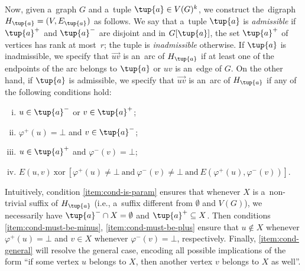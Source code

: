 Now, given a~graph $G$ and a~tuple $\tup{a} \in V(G)^k$, we construct the~digraph $H_{\tup{a}} = (V, E_{\tup{a}})$ as follows.
We say that a~tuple $\tup{a}$ is \emph{admissible} if $\tup{a}^+$ and $\tup{a}^-$ are disjoint and in $G[\tup{a}]$, the set $\tup{a}^+$ of vertices has rank at most~$r$; the tuple is \emph{inadmissible} otherwise.
If $\tup{a}$ is inadmissible, we specify that $\vec{uv}$ is an~arc of $H_{\tup{a}}$ if at least one of the endpoints of the arc belongs to $\tup{a}$ or $uv$ is an~edge of $G$.
On the other hand, if $\tup{a}$ is admissible, we specify that $\vec{uv}$ is an~arc of $H_{\tup{a}}$ if any of the following conditions hold:
\begin{enumerate}[(i),nosep]
    \item \label{item:cond-is-param} $u \in \tup{a}^-$ or $v \in \tup{a}^+$;
    \item \label{item:cond-must-be-minus} $\varphi^+(u) = \bot$ and $v \in \tup{a}^-$;
    \item \label{item:cond-must-be-plus} $u \in \tup{a}^+$ and $\varphi^-(v) = \bot$;
    \item \label{item:cond-general} $E(u, v)\ \textrm{xor}\ [\varphi^+(u) \neq \bot\ \textrm{and}\ \varphi^-(v) \neq \bot \ \textrm{and}\ E(\varphi^+(u), \varphi^-(v))]$.
\end{enumerate}


Intuitively, condition \ref{item:cond-is-param} ensures that whenever $X$ is a~non-trivial suffix of $H_{\tup{a}}$ (i.e., a~suffix different from $\emptyset$ and $V(G)$), we necessarily have $\tup{a}^- \cap X = \emptyset$ and $\tup{a}^+ \subseteq X$.
Then conditions \ref{item:cond-must-be-minus}, \ref{item:cond-must-be-plus} ensure that $u \notin X$ whenever $\varphi^+(u) = \bot$ and $v \in X$ whenever $\varphi^-(v) = \bot$, respectively.
Finally, \ref{item:cond-general} will resolve the general case, encoding all possible implications of the form ``if some vertex $u$ belongs to $X$, then another vertex $v$ belongs to $X$ as well''.

